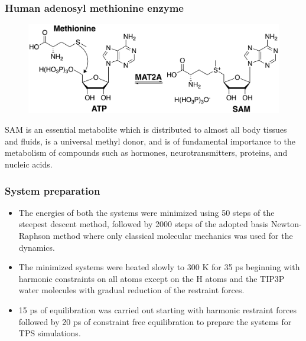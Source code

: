 \documentclass{beamer}
\begin{document}
\begin{frame}
\frametitle{Human adenosyl methionine enzyme}
\begin{figure}
\centering 
\includegraphics[scale=0.6]{figures/mat2a-reaction.png}
\end{figure}
SAM is an essential metabolite which is distributed to almost all body tissues and fluids, is a
universal methyl donor, and is of fundamental importance to
the metabolism of compounds such as hormones, neurotransmitters, proteins, and nucleic acids.
\end{frame}
\begin{frame}
\frametitle{System preparation}
\begin{itemize}
\item The energies of both the systems were minimized using 50 steps of the 
steepest descent method, followed by 2000 steps of the
adopted basis Newton-Raphson method where only classical molecular mechanics 
was used for the dynamics. 

\item The minimized systems were
heated slowly to 300 K for 35 ps beginning with harmonic
constraints on all atoms except on the H atoms and the TIP3P 
water molecules with gradual reduction of the restraint forces. 

\item 15 ps of equilibration was carried out starting with harmonic 
restraint forces followed by 20 ps of constraint free 
equilibration to prepare the systems for TPS simulations. 

\end{itemize}
\end{frame}
\end{document}
